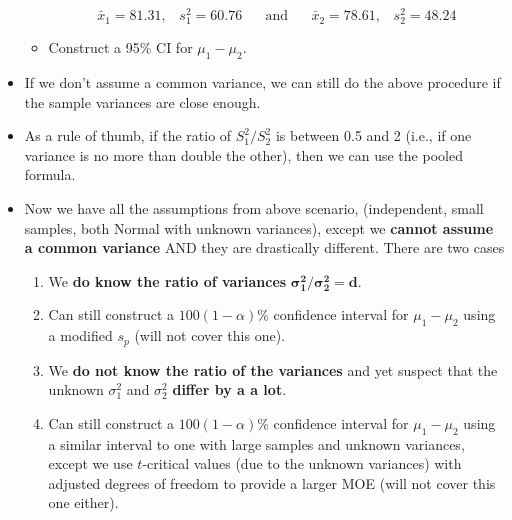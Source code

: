 \documentclass{article}
\begin{document}
\begin{itemize}
\begin{itemize}
        \[\bar{x}_1 = 81.31, \hspace{10pt} s^2_1 = 60.76 \hspace{20pt} \text{and} \hspace{20pt} \bar{x}_2 = 78.61, \hspace{10pt} s^2_2 = 48.24\]
        \item[] Construct a 95\% CI for $\mu_1 - \mu_2$.\vspace{80pt}
    \end{itemize}\bigskip
    \item If we don't assume a common variance, we can still do the above procedure if the sample variances are close enough.
    \item[] As a rule of thumb, if the ratio of $S_1^2 / S_2^2$ is between 0.5 and 2 (i.e., if one variance is no more than double the other), then we can use the pooled formula.
    \item Now we have all the assumptions from above scenario, (independent, small samples, both Normal with unknown variances), except we \textbf{cannot assume a common variance} AND they are drastically different. There are two cases
    \begin{enumerate}
        \item We \textbf{do know the ratio of variances} $\boldsymbol{\sigma^2_1 / \sigma^2_2  = d}$.
        \item[] Can still construct a $100 (1 - \alpha)\%$ confidence interval for $\mu_1 - \mu_2$ using a modified $s_p$ (will not cover this one).
        \item We \textbf{do not know the ratio of the variances} and yet suspect that the unknown $\sigma^2_1$ and $\sigma^2_2$ \textbf{differ by a a lot}.
        \item[] Can still construct a $100(1 - \alpha)\%$ confidence interval for $\mu_1 - \mu_2$ using a similar interval to one with large samples and unknown variances, except we use $t$-critical values (due to the unknown variances) with adjusted degrees of freedom to provide a larger MOE (will not cover this one either).
    \end{enumerate}        
\end{itemize}\bigskip
\end{document}

